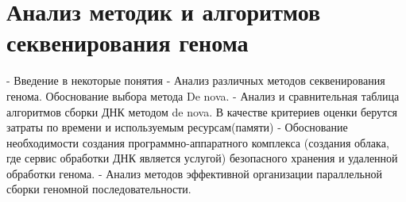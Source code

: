 \chapter{Анализ методик и алгоритмов секвенирования генома}
- Введение в некоторые понятия
- Анализ различных методов секвенирования генома. Обоснование выбора метода De nova.
- Анализ и сравнительная таблица алгоритмов сборки ДНК методом de nova. В качестве критериев оценки берутся затраты по времени и используемым ресурсам(памяти)
- Обоснование необходимости создания программно-аппаратного комплекса (создания облака, где сервис обработки ДНК является услугой) безопасного хранения и удаленной обработки генома.
- Анализ методов эффективной организации параллельной сборки геномной последовательности.
%
%
%
%
%